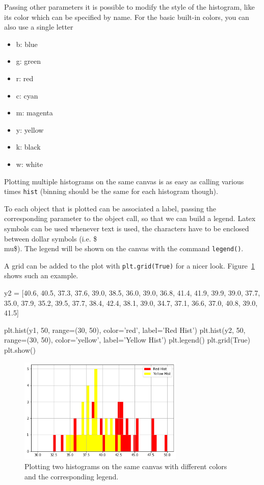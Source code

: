 Passing other parameters it is possible to modify the style of the
histogram, like its color which can be specified by name. For the basic built-in colors, you can also use a single letter

\begin{itemize}
\tightlist
\item b: blue
\item g: green
\item r: red
\item c: cyan
\item m: magenta
\item y: yellow
\item k: black
\item w: white
\end{itemize}

Plotting multiple histograms on the same canvas is as easy as calling various times \texttt{hist} (binning should be the same for each histogram though).

To each object that is plotted can be associated a label, passing the corresponding parameter to the object call, so that we can build a legend. Latex symbols can be used whenever text is used, the characters have to be enclosed between dollar symbols (i.e. \$\\mu\$). 
The legend will be shown on the canvas with the command  \texttt{legend()}.

A grid can be added to the plot with \texttt{plt.grid(True)} for a nicer look. Figure~\ref{fig:histo3} shows such an example.

\begin{ipython}
y2 = [40.6, 40.5, 37.3, 37.6, 39.0, 38.5, 36.0, 
      39.0, 36.8, 41.4, 41.9, 39.9, 39.0, 37.7, 
      35.0, 37.9, 35.2, 39.5, 37.7, 38.4, 42.4, 
      38.1, 39.0, 34.7, 37.1, 36.6, 37.0, 40.8, 
      39.0, 41.5]

plt.hist(y1, 50, range=(30, 50), color='red', label='Red Hist')
plt.hist(y2, 50, range=(30, 50), color='yellow', label='Yellow Hist')
plt.legend()
plt.grid(True)
plt.show()
\end{ipython}

\begin{figure}[htb]
	\centering
	\includegraphics[width=0.7\textwidth]{figures/histo3}
	\caption{Plotting two histograms on the same canvas with different colors and the 
		corresponding legend.}
	\label{fig:histo3}
\end{figure}

